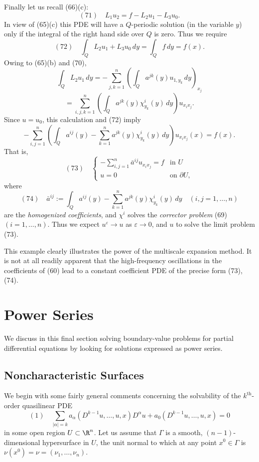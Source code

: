 \begin{example}
Finally let us recall (66)(c):
$$(71) \quad L_1 u_2 = f - L_2 u_1 - L_3 u_0.$$
In view of (65)(c) this PDE will have a $Q$-periodic solution (in the variable $y$) only if the integral of the right hand side over $Q$ is zero. Thus we require
$$(72) \quad \int_Q L_2 u_1 + L_3 u_0 \, dy = \int_Q f \, dy = f(x).$$
Owing to (65)(b) and (70),
$$\int_Q L_2 u_1 \, dy = -\sum_{j,k=1}^n \left( \int_Q a^{jk}(y)u_{1,y_k} \, dy \right)_{x_j}$$
$$= \sum_{i,j,k=1}^n \left( \int_Q a^{jk}(y)\chi^i_{y_k}(y) \, dy \right) u_{x_i x_j}.$$
Since $u = u_0$, this calculation and (72) imply
$$-\sum_{i,j=1}^{n}\left(\int_Q a^{ij}(y) - \sum_{k=1}^{n}a^{jk}(y)\chi^i_{y_k}(y)\,dy\right)u_{x_i x_j}(x) = f(x).$$
That is,
$$(73) \quad \begin{cases} -\sum_{i,j=1}^{n} \bar{a}^{ij} u_{x_i x_j} = f & \text{in } U \\ u = 0 & \text{on } \partial U, \end{cases}$$
where
$$(74) \quad \bar{a}^{ij} := \int_Q a^{ij}(y) - \sum_{k=1}^{n} a^{jk}(y) \chi^i_{y_k}(y)\,dy \quad (i,j=1,\ldots,n)$$
are the \textit{homogenized coefficients}, and $\chi^i$ solves the \textit{corrector problem} (69) $(i=1,\ldots,n)$. Thus we expect $u^\varepsilon \to u$ as $\varepsilon \to 0$, and $u$ to solve the limit problem (73).

This example clearly illustrates the power of the multiscale expansion method. It is not at all readily apparent that the high-frequency oscillations in the coefficients of (60) lead to a constant coefficient PDE of the precise form (73), (74).
\end{example}

\section{Power Series}
\label{sec:power-series}

We discuss in this final section solving boundary-value problems for partial differential equations by looking for solutions expressed as power series.

\subsection{Noncharacteristic Surfaces}
\label{sec:noncharacteristic-surfaces}

We begin with some fairly general comments concerning the solvability of the $k^{\text{th}}$-order quasilinear PDE
$$(1) \quad \sum_{|\alpha|=k} a_\alpha(D^{k-1}u,\ldots,u,x)D^\alpha u + a_0(D^{k-1}u,\ldots,u,x) = 0$$
in some open region $U \subset \R^n$. Let us assume that $\Gamma$ is a smooth, $(n-1)$-dimensional hypersurface in $U$, the unit normal to which at any point $x^0 \in \Gamma$ is $\nu(x^0) = \nu = (\nu_1,\ldots,\nu_n)$.

